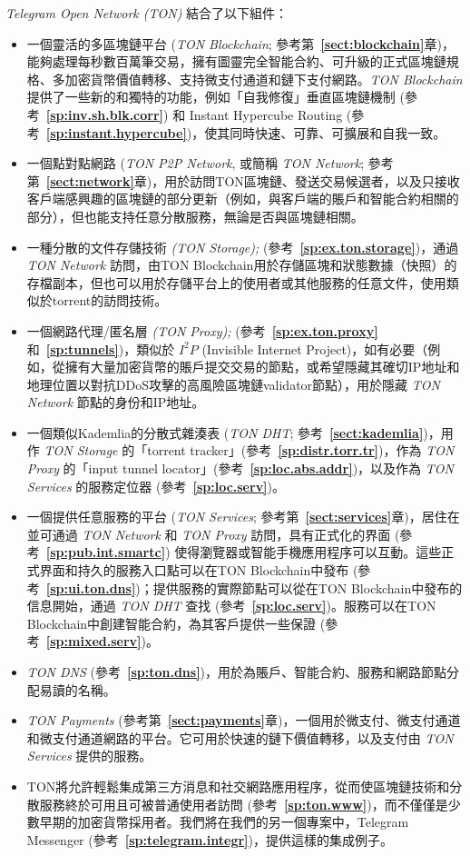 \documentclass[12pt,oneside]{article}
\def\refpoint#1{{\rm\textbf{\ref{#1}}}}
\let\ptref=\refpoint
\begin{document}
{\em Telegram Open Network (TON)} 結合了以下組件：
\begin{itemize}
\item 一個靈活的多區塊鏈平台 ({\em TON Blockchain}; 參考第~\ptref{sect:blockchain}章)，能夠處理每秒數百萬筆交易，擁有圖靈完全智能合約、可升級的正式區塊鏈規格、多加密貨幣價值轉移、支持微支付通道和鏈下支付網路。{\em TON Blockchain\/} 提供了一些新的和獨特的功能，例如「自我修復」垂直區塊鏈機制 (參考~\ptref{sp:inv.sh.blk.corr}) 和 Instant Hypercube Routing (參考~\ptref{sp:instant.hypercube})，使其同時快速、可靠、可擴展和自我一致。
\item 一個點對點網路 ({\em TON P2P Network}, 或簡稱 {\em TON Network}; 參考第~\ptref{sect:network}章)，用於訪問TON區塊鏈、發送交易候選者，以及只接收客戶端感興趣的區塊鏈的部分更新（例如，與客戶端的賬戶和智能合約相關的部分），但也能支持任意分散服務，無論是否與區塊鏈相關。
\item 一種分散的文件存儲技術 {\em (TON Storage);} (參考~\ptref{sp:ex.ton.storage})，通過 {\em TON Network} 訪問，由TON Blockchain用於存儲區塊和狀態數據（快照）的存檔副本，但也可以用於存儲平台上的使用者或其他服務的任意文件，使用類似於torrent的訪問技術。
\item 一個網路代理/匿名層 {\em (TON Proxy);} (參考~\ptref{sp:ex.ton.proxy} 和~\ptref{sp:tunnels})，類似於 $I^2P$ (Invisible Internet Project)，如有必要（例如，從擁有大量加密貨幣的賬戶提交交易的節點，或希望隱藏其確切IP地址和地理位置以對抗DDoS攻擊的高風險區塊鏈validator節點），用於隱藏 {\em TON Network\/} 節點的身份和IP地址。
\item 一個類似Kademlia的分散式雜湊表 ({\em TON DHT}; 參考~\ptref{sect:kademlia})，用作 {\em TON Storage} 的「torrent tracker」(參考~\ptref{sp:distr.torr.tr})，作為 {\em TON Proxy\/} 的「input tunnel locator」(參考~\ptref{sp:loc.abs.addr})，以及作為 {\em TON Services} 的服務定位器 (參考~\ptref{sp:loc.serv})。
\item 一個提供任意服務的平台 ({\em TON Services}; 參考第~\ptref{sect:services}章)，居住在並可通過 {\em TON Network\/} 和 {\em TON Proxy} 訪問，具有正式化的界面 (參考~\ptref{sp:pub.int.smartc}) 使得瀏覽器或智能手機應用程序可以互動。這些正式界面和持久的服務入口點可以在TON Blockchain中發布 (參考~\ptref{sp:ui.ton.dns})；提供服務的實際節點可以從在TON Blockchain中發布的信息開始，通過 {\em TON DHT\/} 查找 (參考~\ptref{sp:loc.serv})。服務可以在TON Blockchain中創建智能合約，為其客戶提供一些保證 (參考~\ptref{sp:mixed.serv})。
\item {\em TON DNS\/} (參考~\ptref{sp:ton.dns})，用於為賬戶、智能合約、服務和網路節點分配易讀的名稱。
\item {\em TON Payments\/} (參考第~\ptref{sect:payments}章)，一個用於微支付、微支付通道和微支付通道網路的平台。它可用於快速的鏈下價值轉移，以及支付由 {\em TON Services} 提供的服務。
\item TON將允許輕鬆集成第三方消息和社交網路應用程序，從而使區塊鏈技術和分散服務終於可用且可被普通使用者訪問 (參考~\ptref{sp:ton.www})，而不僅僅是少數早期的加密貨幣採用者。我們將在我們的另一個專案中，Telegram Messenger (參考~\ptref{sp:telegram.integr})，提供這樣的集成例子。
\end{itemize}
\end{document}
